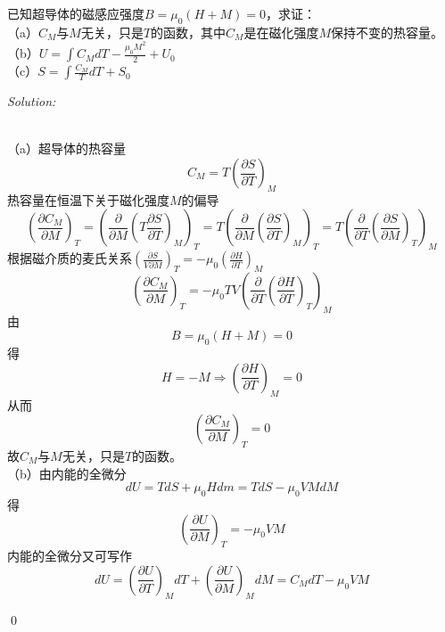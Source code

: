 \documentclass[12pt,a4paper]{article}
\newenvironment{problem}[2][Problem]{\begin{trivlist}
\item[\hskip \labelsep {\bfseries #1}\hskip \labelsep {\bfseries #2.}]}{\end{trivlist}}
\newenvironment{sol}
    {\emph{Solution:}
    }
    {
    \qed
    }
\begin{document}
\begin{problem}{2.20}
已知超导体的磁感应强度$B=\mu_0(H+M)=0$，求证：\\
（a）$C_M$与$M$无关，只是$T$的函数，其中$C_M$是在磁化强度$M$保持不变的热容量。\\
（b）$U=\int C_MdT-\frac{\mu_0M^2}{2}+U_0$\\
（c）$S=\int\frac{C_M}{T}dT+S_0$
\end{problem}
\begin{sol}
\\（a）超导体的热容量
\begin{equation}
C_M=T\left(\frac{\partial S}{\partial T}\right)_M
\end{equation}
热容量在恒温下关于磁化强度$M$的偏导
\begin{equation}
\left(\frac{\partial C_M}{\partial M}\right)_T=\left(\frac{\partial}{\partial M}\left(T\frac{\partial S}{\partial T}\right)_M\right)_T=T\left(\frac{\partial}{\partial M}\left(\frac{\partial S}{\partial T}\right)_M\right)_T=T\left(\frac{\partial}{\partial T}\left(\frac{\partial S}{\partial M}\right)_T\right)_M
\end{equation}
根据磁介质的麦氏关系$\left(\frac{\partial S}{V\partial M}\right)_T=-\mu_0\left(\frac{\partial H}{\partial T}\right)_M$
\begin{equation}
\left(\frac{\partial C_M}{\partial M}\right)_T=-\mu_0TV\left(\frac{\partial}{\partial T}\left(\frac{\partial H}{\partial T}\right)_T\right)_M
\end{equation}
由
\begin{equation}
B=\mu_0(H+M)=0
\end{equation}
得
\begin{equation}
H=-M\Longrightarrow\left(\frac{\partial H}{\partial T}\right)_M=0
\end{equation}
从而
\begin{equation}
\left(\frac{\partial C_M}{\partial M}\right)_T=0
\end{equation}
故$C_M$与$M$无关，只是$T$的函数。\\
（b）由内能的全微分
\begin{equation}
dU=TdS+\mu_0Hdm=TdS-\mu_0VMdM
\end{equation}
得
\begin{equation}
\left(\frac{\partial U}{\partial M}\right)_T=-\mu_0VM
\end{equation}
内能的全微分又可写作
\begin{equation}
dU=\left(\frac{\partial U}{\partial T}\right)_MdT+\left(\frac{\partial U}{\partial M}\right)_MdM=C_MdT-\mu_0VM

\end{equation}
\end{sol}
\end{document}
